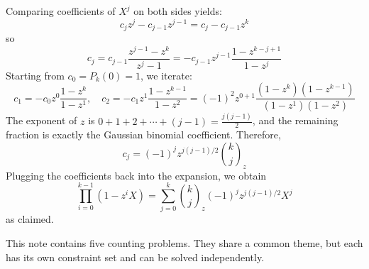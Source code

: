 Comparing coefficients of $X^{j}$ on both sides yields:
\begin{equation*}
    c_{j}z^{j} - c_{j - 1}z^{j - 1} = c_{j} - c_{j - 1}z^{k}
\end{equation*}
so
\begin{equation*}
    c_{j} = c_{j - 1} \frac{z^{j - 1} - z^{k}}{z^{j} - 1} = -c_{j - 1}z^{j - 1} \frac{1 - z^{k - j + 1}}{1 - z^{j}}
\end{equation*}
Starting from $c_{0} = P_{k}(0) = 1$, we iterate:
\begin{equation*}
    c_{1} = -c_{0}z^{0} \frac{1 - z^{k}}{1 - z^{1}}, \quad
    c_{2} = -c_{1}z^{1} \frac{1 - z^{k - 1}}{1 - z^{2}} = (-1)^{2}z^{0 + 1} \frac{(1 - z^{k})(1 - z^{k - 1})}{(1 - z^{1})(1 - z^{2})}
\end{equation*}
The exponent of $z$ is $0 + 1 + 2 + \cdots + (j - 1) = \frac{j(j - 1)}{2}$, and the remaining fraction is exactly the Gaussian binomial coefficient. Therefore,
\begin{equation*}
    c_{j} = (-1)^{j}z^{j(j - 1)/2} \binom{k}{j}_{z}
\end{equation*}
Plugging the coefficients back into the expansion, we obtain
\begin{equation*}
    \prod_{i = 0}^{k - 1}(1 - z^{i}X) = \sum_{j = 0}^{k} \binom{k}{j}_{z}(-1)^{j}z^{j(j - 1)/2}X^{j}
\end{equation*}
as claimed.


This note contains five counting problems. They share a common theme, but each has its own constraint set and can be solved independently.

